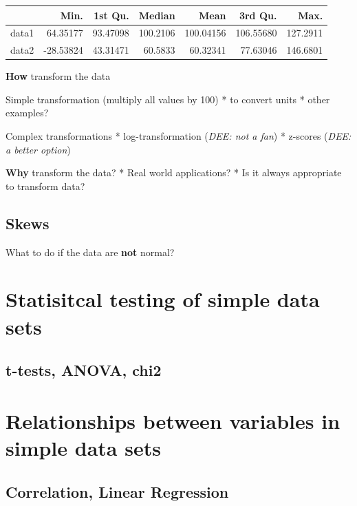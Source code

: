 \documentclass[
]{book}
\begin{document}
\begin{tabular}{l|r|r|r|r|r|r}
\hline
  & Min. & 1st Qu. & Median & Mean & 3rd Qu. & Max.\\
\hline
data1 & 64.35177 & 93.47098 & 100.2106 & 100.04156 & 106.55680 & 127.2911\\
\hline
data2 & -28.53824 & 43.31471 & 60.5833 & 60.32341 & 77.63046 & 146.6801\\
\hline
\end{tabular}

\textbf{How} transform the data

Simple transformation (multiply all values by 100)
* to convert units
* other examples?

Complex transformations
* log-transformation (\emph{DEE: not a fan})
* z-scores (\emph{DEE: a better option})

\textbf{Why} transform the data?
* Real world applications?
* Is it always appropriate to transform data?

\hypertarget{skews}{%
\subsection{Skews}\label{skews}}

What to do if the data are \textbf{not} normal?

\hypertarget{statisitcal-testing-of-simple-data-sets}{%
\section{Statisitcal testing of simple data sets}\label{statisitcal-testing-of-simple-data-sets}}

\hypertarget{t-tests-anova-chi2}{%
\subsection{t-tests, ANOVA, chi2}\label{t-tests-anova-chi2}}

\hypertarget{relationships-between-variables-in-simple-data-sets}{%
\section{Relationships between variables in simple data sets}\label{relationships-between-variables-in-simple-data-sets}}

\hypertarget{correlation-linear-regression}{%
\subsection{Correlation, Linear Regression}\label{correlation-linear-regression}}
\end{document}
